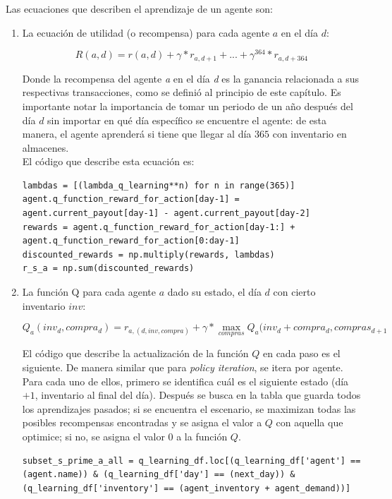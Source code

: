 Las ecuaciones que describen el aprendizaje de un agente son:

\begin{enumerate}
    \item La ecuaci\'on de utilidad (o recompensa) para cada agente $a$ en el d\'ia $d$:

$$
R(a, d) = r(a,d) + \gamma*r_{a, d+1} + ... + \gamma^{364}*r_{a,d+364}
$$

Donde la recompensa del agente \textit{a} en el d\'ia \textit{d} es la ganancia relacionada a sus respectivas transacciones, como se defini\'o al principio de este cap\'itulo. Es importante notar la importancia de tomar un periodo de un a\~no despu\'es del d\'ia $d$ sin importar en qu\'e d\'ia espec\'ifico se encuentre el agente: de esta manera, el agente aprender\'a si tiene que llegar al d\'ia $365$ con inventario en almacenes.\\

El c\'odigo que describe esta ecuaci\'on es:

\begin{verbatim}
lambdas = [(lambda_q_learning**n) for n in range(365)]
agent.q_function_reward_for_action[day-1] = agent.current_payout[day-1] - agent.current_payout[day-2]
rewards = agent.q_function_reward_for_action[day-1:] + agent.q_function_reward_for_action[0:day-1]
discounted_rewards = np.multiply(rewards, lambdas)
r_s_a = np.sum(discounted_rewards)
\end{verbatim}


\item La funci\'on Q para cada agente $a$ dado su estado, el d\'ia $d$ con cierto inventario $inv$:

$$
Q_{a}(inv_{d},compra_{d}) = r_{a, (d, inv, compra)} + \gamma * \max_{compras}{Q_{a}(inv_{d} + compra_{d}, compras_{d+1}}
$$

El c\'odigo que describe la actualizaci\'on de la funci\'on $Q$ en cada paso es el siguiente. De manera similar que para \textit{policy iteration}, se itera por agente. Para cada uno de ellos, primero se identifica cu\'al es el siguiente estado (d\'ia $+1$, inventario al final del d\'ia). Despu\'es se busca en la tabla que guarda todos los aprendizajes pasados; si se encuentra el escenario, se maximizan todas las posibles recompensas encontradas y se asigna el valor a $Q$ con aquella que optimice; si no, se asigna el valor $0$ a la funci\'on $Q$. 

\begin{verbatim}
subset_s_prime_a_all = q_learning_df.loc[(q_learning_df['agent'] == (agent.name)) & (q_learning_df['day'] == (next_day)) & (q_learning_df['inventory'] == (agent_inventory + agent_demand))]


\end{verbatim}
\end{enumerate}
